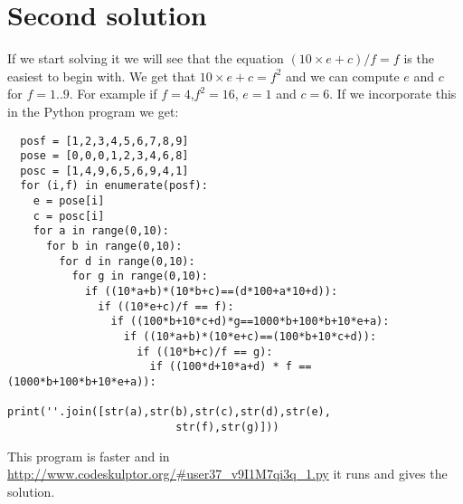 \documentclass{article}
\begin{document}
\section{Second solution}
If we start solving it we will see that the equation $(10\times e+c)/f=f$ is the easiest to begin with. We get that $10\times e+c=f^2$ and we can compute $e$ and $c$ for $f=1..9$. For example if $f=4$,$f^2=16$,
$e=1$ and $c=6$.
If we incorporate this in the Python program we get:
\begin{lstlisting}
  posf = [1,2,3,4,5,6,7,8,9]
  pose = [0,0,0,1,2,3,4,6,8]
  posc = [1,4,9,6,5,6,9,4,1]
  for (i,f) in enumerate(posf):
    e = pose[i]
    c = posc[i]
    for a in range(0,10):
      for b in range(0,10):
        for d in range(0,10):
          for g in range(0,10):
            if ((10*a+b)*(10*b+c)==(d*100+a*10+d)):
              if ((10*e+c)/f == f):
                if ((100*b+10*c+d)*g==1000*b+100*b+10*e+a):
                  if ((10*a+b)*(10*e+c)==(100*b+10*c+d)):
                    if ((10*b+c)/f == g):
                      if ((100*d+10*a+d) * f == (1000*b+100*b+10*e+a)):
                        print(''.join([str(a),str(b),str(c),str(d),str(e),
                          str(f),str(g)]))
\end{lstlisting}
This program is faster and in \url{http://www.codeskulptor.org/#user37_v9I1M7qi3q_1.py} it runs and gives the solution.
\end{document}
